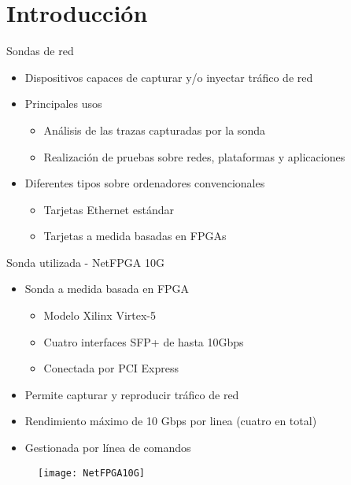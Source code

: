 \section{Introducción}

\begin{frame}{Sondas de red}
  \begin{itemize}
    \item Dispositivos capaces de capturar y/o inyectar tráfico de red
    \item Principales usos
    \begin{itemize}
      \item Análisis de las trazas capturadas por la sonda
      \item Realización de pruebas sobre redes, plataformas y aplicaciones
    \end{itemize}
    \item Diferentes tipos sobre ordenadores convencionales
    \begin{itemize}
      \item Tarjetas Ethernet estándar
      \item Tarjetas a medida basadas en FPGAs
    \end{itemize}
  \end{itemize}
\end{frame}

\begin{frame}{Sonda utilizada - NetFPGA 10G}
  \begin{itemize}
    \item Sonda a medida basada en FPGA
    \begin{itemize}
      \item Modelo Xilinx Virtex-5
      \item Cuatro interfaces SFP+ de hasta 10Gbps
      \item Conectada por PCI Express
    \end{itemize}
    \item Permite capturar y reproducir tráfico de red
    \item Rendimiento máximo de 10 Gbps por linea (cuatro en total)
    \item Gestionada por línea de comandos
  \end{itemize}
  \begin{figure}
    \texttt{[image: NetFPGA10G]}
  \end{figure}
\end{frame}
